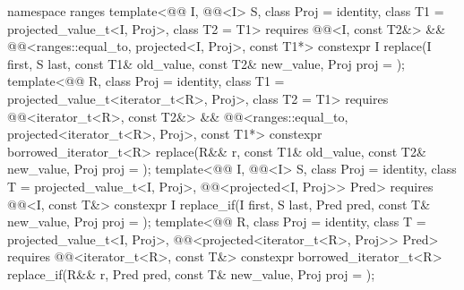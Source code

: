 \begin{codeblock}
{  namespace ranges {
    template<@@ I, @@<I> S, class Proj = identity,
             class T1 = projected_value_t<I, Proj>, class T2 = T1>
      requires @@<I, const T2&> &&
               @@<ranges::equal_to, projected<I, Proj>, const T1*>
      constexpr I
        replace(I first, S last, const T1& old_value, const T2& new_value, Proj proj = {});
    template<@@ R, class Proj = identity,
             class T1 = projected_value_t<iterator_t<R>, Proj>, class T2 = T1>
      requires @@<iterator_t<R>, const T2&> &&
               @@<ranges::equal_to,
                                         projected<iterator_t<R>, Proj>, const T1*>
      constexpr borrowed_iterator_t<R>
        replace(R&& r, const T1& old_value, const T2& new_value, Proj proj = {});
    template<@@ I, @@<I> S, class Proj = identity,
             class T = projected_value_t<I, Proj>,
             @@<projected<I, Proj>> Pred>
      requires @@<I, const T&>
      constexpr I replace_if(I first, S last, Pred pred, const T& new_value, Proj proj = {});
    template<@@ R, class Proj = identity, class T = projected_value_t<I, Proj>,
             @@<projected<iterator_t<R>, Proj>> Pred>
      requires @@<iterator_t<R>, const T&>
      constexpr borrowed_iterator_t<R>
        replace_if(R&& r, Pred pred, const T& new_value, Proj proj = {});
  }

}
\end{codeblock}
